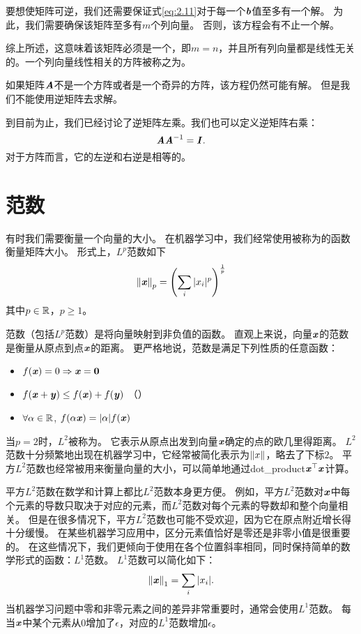 要想使矩阵可逆，我们还需要保证式\ref{eq:2.11}对于每一个$\boldsymbol{\mathit{b}}$值至多有一个解。
为此，我们需要确保该矩阵至多有$m$个列向量。
否则，该方程会有不止一个解。


综上所述，这意味着该矩阵必须是一个，即$m=n$，并且所有列向量都是线性无关的。一个列向量线性相关的方阵被称之为。


如果矩阵$\boldsymbol{\mathit{A}}$不是一个方阵或者是一个奇异的方阵，该方程仍然可能有解。
但是我们不能使用逆矩阵去求解。


到目前为止，我们已经讨论了逆矩阵左乘。我们也可以定义逆矩阵右乘：
\begin{equation}
\boldsymbol{\mathit{A}}\boldsymbol{\mathit{A}}^{-1}=\boldsymbol{\mathit{I}}.
\end{equation}
对于方阵而言，它的左逆和右逆是相等的。




\section{范数}
\label{sec:norms}

有时我们需要衡量一个向量的大小。
在机器学习中，我们经常使用被称为的函数衡量矩阵大小。
形式上，$L^p$范数如下
\begin{equation}
\label{eq:2.30}
    \left\lVert\boldsymbol{\mathit{x}}\right\rVert_p = \left( \sum_i |x_i|^p \right)^{\frac{1}{p}}
\end{equation}
其中$p\in \mathbb{R}$，$p\geq 1$。





范数（包括$L^p$范数）是将向量映射到非负值的函数。
直观上来说，向量$\boldsymbol{\mathit{x}}$的范数是衡量从原点到点$\boldsymbol{\mathit{x}}$的距离。
更严格地说，范数是满足下列性质的任意函数：
\begin{itemize}
\item $f(\boldsymbol{\mathit{x}}) = 0 \Rightarrow \boldsymbol{\mathit{x}} = \mathbf{0}$ 
\item $f(\boldsymbol{\mathit{x}} + \boldsymbol{\mathit{y}}) \leq f(\boldsymbol{\mathit{x}}) + f(\boldsymbol{\mathit{y}})$ （）
\item $\forall \alpha \in \mathbb{R}$, $f(\alpha \boldsymbol{\mathit{x}}) = |\alpha| f(\boldsymbol{\mathit{x}})$
\end{itemize}


当$p=2$时，$L^2$被称为。
它表示从原点出发到向量$\boldsymbol{\mathit{x}}$确定的点的欧几里得距离。
$L^2$范数十分频繁地出现在机器学习中，它经常被简化表示为$\left\lVert x\right\rVert$，略去了下标$2$。
平方$L^2$范数也经常被用来衡量向量的大小，可以简单地通过\gls{dot_product}$\boldsymbol{\mathit{x}}^\top\boldsymbol{\mathit{x}}$计算。


平方$L^2$范数在数学和计算上都比$L^2$范数本身更方便。
例如，平方$L^2$范数对$\boldsymbol{\mathit{x}}$中每个元素的导数只取决于对应的元素，而$L^2$范数对每个元素的导数却和整个向量相关。
但是在很多情况下，平方$L^2$范数也可能不受欢迎，因为它在原点附近增长得十分缓慢。
在某些机器学习应用中，区分元素值恰好是零还是非零小值是很重要的。
在这些情况下，我们更倾向于使用在各个位置斜率相同，同时保持简单的数学形式的函数：$L^1$范数。
$L^1$范数可以简化如下：
\begin{equation}
    \left\lVert\boldsymbol{\mathit{x}}\right\rVert_1 = \sum_i  |x_i|.
\end{equation}
当机器学习问题中零和非零元素之间的差异非常重要时，通常会使用$L^1$范数。
每当$\boldsymbol{\mathit{x}}$中某个元素从$0$增加了$\epsilon$，对应的$L^1$范数增加$\epsilon$。


